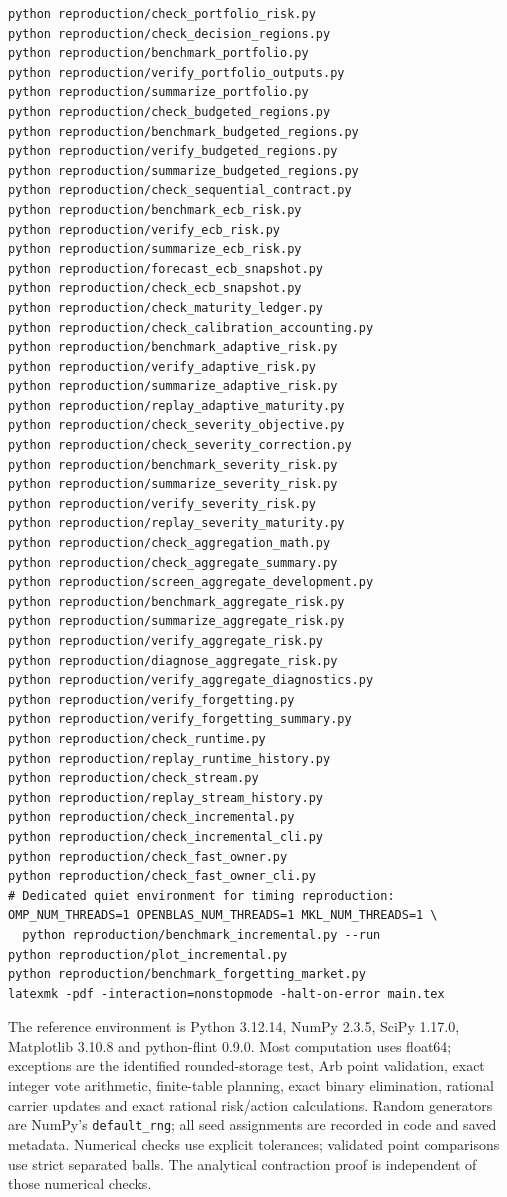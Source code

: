 \documentclass[11pt,a4paper]{article}
\theoremstyle{definition}\newtheorem{definition}[theorem]{Definition}
\begin{document}
\begin{verbatim}
python reproduction/check_portfolio_risk.py
python reproduction/check_decision_regions.py
python reproduction/benchmark_portfolio.py
python reproduction/verify_portfolio_outputs.py
python reproduction/summarize_portfolio.py
python reproduction/check_budgeted_regions.py
python reproduction/benchmark_budgeted_regions.py
python reproduction/verify_budgeted_regions.py
python reproduction/summarize_budgeted_regions.py
python reproduction/check_sequential_contract.py
python reproduction/benchmark_ecb_risk.py
python reproduction/verify_ecb_risk.py
python reproduction/summarize_ecb_risk.py
python reproduction/forecast_ecb_snapshot.py
python reproduction/check_ecb_snapshot.py
python reproduction/check_maturity_ledger.py
python reproduction/check_calibration_accounting.py
python reproduction/benchmark_adaptive_risk.py
python reproduction/verify_adaptive_risk.py
python reproduction/summarize_adaptive_risk.py
python reproduction/replay_adaptive_maturity.py
python reproduction/check_severity_objective.py
python reproduction/check_severity_correction.py
python reproduction/benchmark_severity_risk.py
python reproduction/summarize_severity_risk.py
python reproduction/verify_severity_risk.py
python reproduction/replay_severity_maturity.py
python reproduction/check_aggregation_math.py
python reproduction/check_aggregate_summary.py
python reproduction/screen_aggregate_development.py
python reproduction/benchmark_aggregate_risk.py
python reproduction/summarize_aggregate_risk.py
python reproduction/verify_aggregate_risk.py
python reproduction/diagnose_aggregate_risk.py
python reproduction/verify_aggregate_diagnostics.py
python reproduction/verify_forgetting.py
python reproduction/verify_forgetting_summary.py
python reproduction/check_runtime.py
python reproduction/replay_runtime_history.py
python reproduction/check_stream.py
python reproduction/replay_stream_history.py
python reproduction/check_incremental.py
python reproduction/check_incremental_cli.py
python reproduction/check_fast_owner.py
python reproduction/check_fast_owner_cli.py
# Dedicated quiet environment for timing reproduction:
OMP_NUM_THREADS=1 OPENBLAS_NUM_THREADS=1 MKL_NUM_THREADS=1 \
  python reproduction/benchmark_incremental.py --run
python reproduction/plot_incremental.py
python reproduction/benchmark_forgetting_market.py
latexmk -pdf -interaction=nonstopmode -halt-on-error main.tex
\end{verbatim}
The reference environment is Python 3.12.14, NumPy 2.3.5, SciPy 1.17.0, Matplotlib 3.10.8 and python-flint 0.9.0. Most computation uses float64; exceptions are the identified rounded-storage test, Arb point validation, exact integer vote arithmetic, finite-table planning, exact binary elimination, rational carrier updates and exact rational risk/action calculations. Random generators are NumPy's \texttt{default\_rng}; all seed assignments are recorded in code and saved metadata. Numerical checks use explicit tolerances; validated point comparisons use strict separated balls. The analytical contraction proof is independent of those numerical checks.
\end{document}
